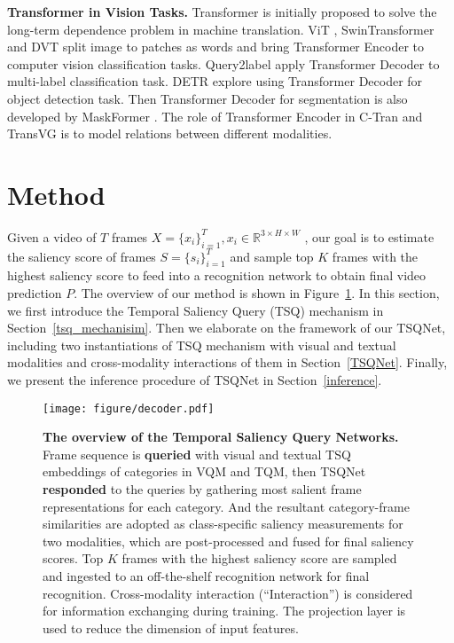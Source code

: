 \documentclass[runningheads]{llncs}
\newcommand{\figref}[1]{Figure~\ref{#1}}
\newcommand{\secref}[1]{Section~\ref{#1}}
\begin{document}
\noindent\textbf{Transformer in Vision Tasks.} Transformer \cite{transformer} is initially proposed to solve the long-term dependence problem in machine translation.
ViT \cite{vit}, SwinTransformer  \cite{swintransformer} and DVT \cite{dvt} split image to patches as words and bring Transformer Encoder to computer vision classification tasks. Query2label \cite{query2label} apply Transformer Decoder to multi-label classification task.
DETR \cite{detr} explore using Transformer Decoder for object detection task.  
Then Transformer Decoder for segmentation is also developed by MaskFormer  \cite{maskformer}. 
The role of Transformer Encoder in C-Tran \cite{ctran} and TransVG \cite{transvg} is to model relations between different modalities.





\section{Method}
Given a video of $T$ frames $X =\{x_i \}_{i=1}^{T}, x_i \in \mathbb{R}^{3\times H\times W}$ , our goal is to estimate the saliency score of frames $S =\{s_i \}_{i=1}^{T}$ and sample top $K$ frames with the highest saliency score to feed into a recognition network to obtain final video prediction $P$. The overview of our method is shown in \figref{Fig.main1}. 
In this section, we first introduce the Temporal Saliency Query (TSQ) mechanism in \secref{tsq_mechanisim}. Then we elaborate on the framework of our TSQNet, including two instantiations of TSQ mechanism with visual and textual modalities and cross-modality interactions of them in \secref{TSQNet}. Finally, we present the inference procedure of TSQNet in \secref{inference}.





\begin{figure}[t] \centering \texttt{[image: figure/decoder.pdf]} \caption{\textbf{The overview of the Temporal Saliency Query Networks.} Frame sequence is \textbf{queried} with visual and textual TSQ embeddings of categories in VQM and TQM, then TSQNet \textbf{responded} to the queries by gathering most salient frame representations for each category. And the resultant category-frame similarities are adopted as class-specific saliency measurements for two modalities, which are post-processed and fused for final saliency scores. Top $K$ frames with the highest saliency score are sampled and ingested to an off-the-shelf recognition network for final recognition. 
Cross-modality interaction (``Interaction'') is considered for information exchanging during training. 
The projection layer is used to reduce the dimension of input features. 
} \label{Fig.main1} \end{figure}
\end{document}
